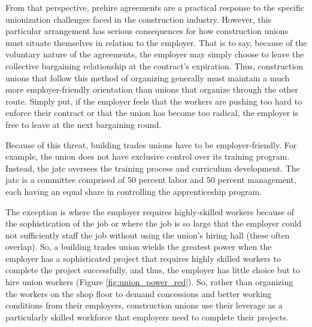 \documentclass[12pt]{article}
\begin{document}
From that perspective, prehire agreements are a practical response to the specific unionization challenges faced in the construction industry. However, this particular arrangement has serious consequences for how construction unions must situate themselves in relation to the employer. That is to say, because of the voluntary nature of the agreements, the employer may simply choose to leave the collective bargaining relationship at the contract's expiration. Thus, construction unions that follow this method of organizing generally must maintain a much more employer-friendly orientation than unions that organize through the other route. Simply put, if the employer feels that the workers are pushing too hard to enforce their contract or that the union has become too radical, the employer is free to leave at the next bargaining round.

Because of this threat, building trades unions have to be employer-friendly. For example, the union does not have exclusive control over its training program. Instead, the \acrfull{jatc} oversees the training process and curriculum development. The \acrshort{jatc} is a committee comprised of 50 percent labor and 50 percent management, each having an equal share in controlling the apprenticeship program. 

The exception is where the employer requires highly-skilled workers because of the sophistication of the job or where the job is so large that the employer could not sufficiently staff the job without using the union's hiring hall (these often overlap). So, a building trades union wields the greatest power when the employer has a sophisticated project that requires highly skilled workers to complete the project successfully, and thus, the employer has little choice but to hire union workers (Figure \ref{fig:union_power_red}). So, rather than organizing the workers on the shop floor to demand concessions and better working conditions from their employers, construction unions use their leverage as a particularly skilled workforce that employers need to complete their projects.
\end{document}
